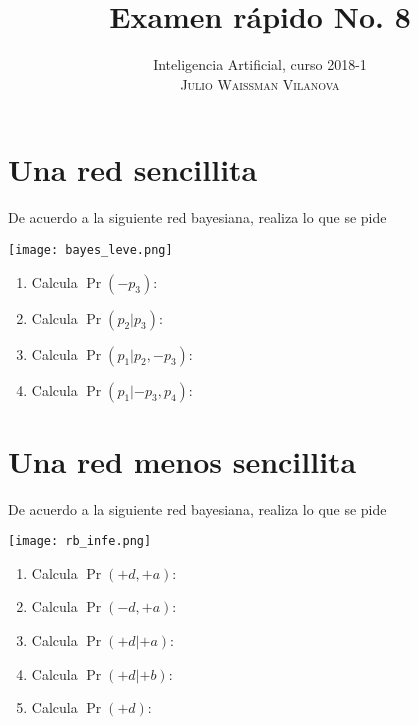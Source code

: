 \documentclass[onecolumn, letter, 11pt]{article}
\title{Examen rápido No. 8}
\author{Inteligencia Artificial, curso 2018-1\\ \textsc{Julio Waissman Vilanova}}
\date{}
\begin{document}
\maketitle

\section{Una red sencillita}

De acuerdo a la siguiente red bayesiana, realiza lo que se pide

\begin{center}
  \texttt{[image: bayes\_leve.png]}
\end{center}

\vspace{1cm}

\begin{enumerate}
\item Calcula $\Pr(-p_3)$:
\item Calcula $\Pr(p_2|p_3)$:
\item Calcula $\Pr(p_1|p_2, -p_3)$:
\item Calcula $\Pr(p_1|-p_3, p_4)$:
\end{enumerate}

\newpage
\section{Una red menos sencillita}

De acuerdo a la siguiente red bayesiana, realiza lo que se pide

\begin{center}
  \texttt{[image: rb\_infe.png]}
\end{center}

\begin{enumerate}
\item Calcula $\Pr(+d, +a)$:
\item Calcula $\Pr(-d, +a)$:
\item Calcula $\Pr(+d| +a)$:
\item Calcula $\Pr(+d| +b)$:
\item Calcula $\Pr(+d)$:
\end{enumerate}
\end{document}

